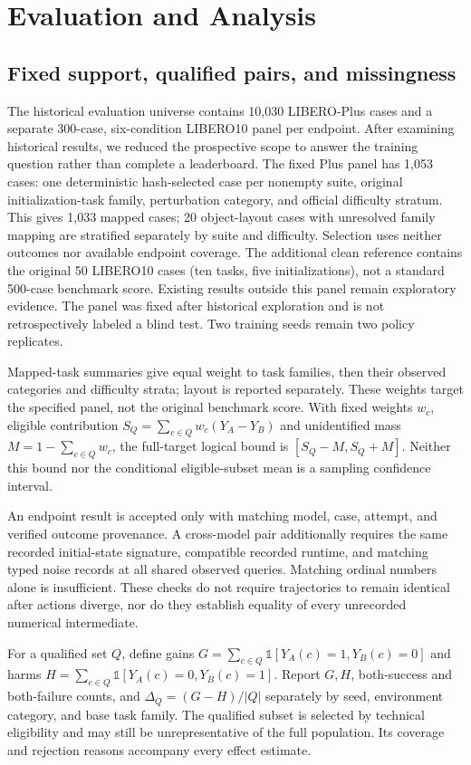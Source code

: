 \documentclass[conference]{IEEEtran}
\begin{document}
\section{Evaluation and Analysis}
\subsection{Fixed support, qualified pairs, and missingness}
The historical evaluation universe contains 10,030 LIBERO-Plus cases and a separate 300-case, six-condition LIBERO10 panel per endpoint. After examining historical results, we reduced the prospective scope to answer the training question rather than complete a leaderboard. The fixed Plus panel has 1,053 cases: one deterministic hash-selected case per nonempty suite, original initialization-task family, perturbation category, and official difficulty stratum. This gives 1,033 mapped cases; 20 object-layout cases with unresolved family mapping are stratified separately by suite and difficulty. Selection uses neither outcomes nor available endpoint coverage. The additional clean reference contains the original 50 LIBERO10 cases (ten tasks, five initializations), not a standard 500-case benchmark score. Existing results outside this panel remain exploratory evidence. The panel was fixed after historical exploration and is not retrospectively labeled a blind test. Two training seeds remain two policy replicates.

Mapped-task summaries give equal weight to task families, then their observed categories and difficulty strata; layout is reported separately. These weights target the specified panel, not the original benchmark score. With fixed weights $w_c$, eligible contribution $S_Q=\sum_{c\in Q}w_c(Y_A-Y_B)$ and unidentified mass $M=1-\sum_{c\in Q}w_c$, the full-target logical bound is $[S_Q-M,S_Q+M]$. Neither this bound nor the conditional eligible-subset mean is a sampling confidence interval.

An endpoint result is accepted only with matching model, case, attempt, and verified outcome provenance. A cross-model pair additionally requires the same recorded initial-state signature, compatible recorded runtime, and matching typed noise records at all shared observed queries. Matching ordinal numbers alone is insufficient. These checks do not require trajectories to remain identical after actions diverge, nor do they establish equality of every unrecorded numerical intermediate.

For a qualified set $Q$, define gains $G=\sum_{c\in Q}\mathbb{1}[Y_A(c)=1,Y_B(c)=0]$ and harms $H=\sum_{c\in Q}\mathbb{1}[Y_A(c)=0,Y_B(c)=1]$. Report $G,H$, both-success and both-failure counts, and $\Delta_Q=(G-H)/|Q|$ separately by seed, environment category, and base task family. The qualified subset is selected by technical eligibility and may still be unrepresentative of the full population. Its coverage and rejection reasons accompany every effect estimate.
\end{document}
